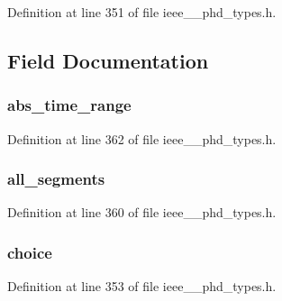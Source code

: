 Definition at line 351 of file ieee\+\_\+\_\+phd\+\_\+types.\+h.



\subsection{Field Documentation}
\hypertarget{struct___segm_selection_a961d635d9456a2015f680617ee057ea7}{}
\subsubsection[{abs\+\_\+time\+\_\+range}]{ abs\+\_\+time\+\_\+range}\label{struct___segm_selection_a961d635d9456a2015f680617ee057ea7}


Definition at line 362 of file ieee\+\_\+\_\+phd\+\_\+types.\+h.

\hypertarget{struct___segm_selection_a8ac8e1085d99d73f52c8d865f5efcdf8}{}
\subsubsection[{all\+\_\+segments}]{ all\+\_\+segments}\label{struct___segm_selection_a8ac8e1085d99d73f52c8d865f5efcdf8}


Definition at line 360 of file ieee\+\_\+\_\+phd\+\_\+types.\+h.

\hypertarget{struct___segm_selection_a034761fd73babd925f56cbb254ce4fb2}{}
\subsubsection[{choice}]{ choice}\label{struct___segm_selection_a034761fd73babd925f56cbb254ce4fb2}


Definition at line 353 of file ieee\+\_\+\_\+phd\+\_\+types.\+h.

\hypertarget{struct___segm_selection_a3743679e4ff85e3e1b3fc2e59973fbb3}{}
